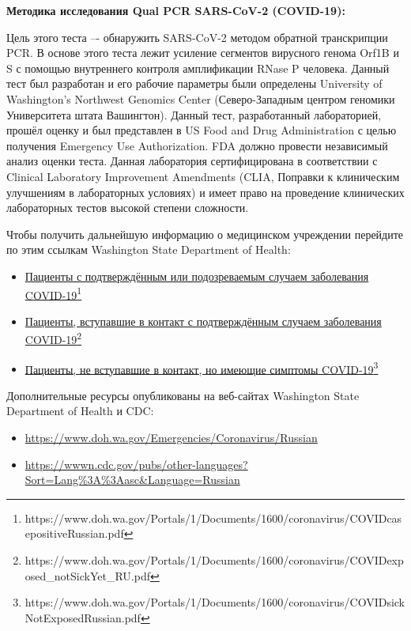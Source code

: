 \documentclass[10pt]{article}
\newcommand{\link}[2]{\href{#1}{#2}\footnote{#1}}
\begin{document}
\bigskip
\textbf{Методика исследования Qual PCR SARS-CoV-2 (COVID-19):}

Цель этого теста –- обнаружить SARS-CoV-2 методом обратной транскрипции PCR. В
основе этого теста лежит усиление сегментов вирусного генома Orf1B и S с помощью
внутреннего контроля амплификации RNase P человека.  Данный тест был разработан
и его рабочие параметры были определены University of Washington’s Northwest
Genomics Center (Северо-Западным центром геномики Университета штата Вашингтон).
Данный тест, разработанный лабораторией, прошёл оценку и был представлен в US
Food and Drug Administration с целью получения Emergency Use Authorization. FDA
должно провести независимый анализ оценки теста. Данная лаборатория
сертифицирована в соответствии с Clinical Laboratory Improvement Amendments
(CLIA, Поправки к клиническим улучшениям в лабораторных условиях) и имеет право
на проведение клинических лабораторных тестов высокой степени сложности.

Чтобы получить дальнейшую информацию о медицинском учреждении перейдите по этим
ссылкам Washington State Department of Health:

\begin{itemize}
\item

  \link{https://www.doh.wa.gov/Portals/1/Documents/1600/coronavirus/COVIDcasepositiveRussian.pdf}{Пациенты
  с подтверждённым или подозреваемым случаем заболевания COVID-19}

\item

  \link{https://www.doh.wa.gov/Portals/1/Documents/1600/coronavirus/COVIDexposed\_notSickYet\_RU.pdf}{Пациенты,
  вступавшие в контакт с подтверждённым случаем заболевания COVID-19}

\item

  \link{https://www.doh.wa.gov/Portals/1/Documents/1600/coronavirus/COVIDsickNotExposedRussian.pdf}{Пациенты,
  не вступавшие в контакт, но имеющие симптомы COVID-19}

\end{itemize}

Дополнительные ресурсы опубликованы на веб-сайтах Washington State Department of
Health и CDC:

\begin{itemize}
\item

  \url{https://www.doh.wa.gov/Emergencies/Coronavirus/Russian}

\item

  \url{https://wwwn.cdc.gov/pubs/other-languages?Sort=Lang%3A%3Aasc&Language=Russian}

\end{itemize}
\end{document}
